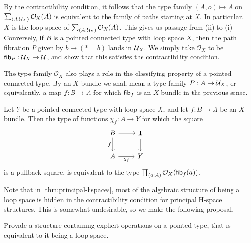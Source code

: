 \documentclass[reqno]{amsart}
\begin{document}
By the contractibility condition, it follows that the type family $(A,o)\mapsto A$
on $\sm{A:\UU_X}\mathcal{O}_X(A)$ is equivalent to the family of paths starting at $X$.
In particular, $X$ is the loop space of $\sm{A:\UU_X}\mathcal{O}_X(A)$. This gives us passage from (ii) to (i). 
Conversely, if $B$ is a pointed connected type with loop space $X$, then the path fibration $P$ given by $b\mapsto (\ast=b)$ lands in $\mathcal{U}_X$. We simply take $\mathcal{O}_X$ to be $\mathsf{fib}_{P}:\mathcal{U}_X\to\mathcal{U}$, and show that this satisfies the contractibility condition. 

The type family $\mathcal{O}_X$ also plays a role in the classifying property of a pointed connected type. By an $X$-bundle we shall mean a type family $P:A\to\mathcal{U}_X$, or equivalently, a map $f:B\to A$ for which $\mathsf{fib}_{f}$ is an $X$-bundle in the previous sense.

\begin{thm}\label{thm:classifier}
Let $Y$ be a pointed connected type with loop space $X$, and let $f:B\to A$ be an $X$-bundle. Then the type of functions $\chi_f:A\to Y$ for which the square
\begin{equation*}
\begin{tikzcd}
B \arrow[r] \arrow[d,swap,"f"] & \unit \arrow[d] \\
A \arrow[r,swap,"\chi_f"] & Y
\end{tikzcd}
\end{equation*}
is a pullback square, is equivalent to the type $\prd{a:A}\mathcal{O}_X(\fib{f}{a})$. 
\end{thm}

Note that in \autoref{thm:principal-hspaces}, most of the algebraic structure of being a loop
space is hidden in the contractibility condition for principal H-space structures. This is somewhat undesirable, so we make the following proposal.

\begin{proposal}\label{p:loop_space}
Provide a structure containing explicit operations on a pointed type, that is equivalent to it being a loop space.
\end{proposal}
\end{document}
